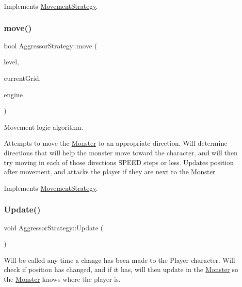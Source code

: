 Implements \hyperlink{class_movement_strategy}{Movement\+Strategy}.

\hypertarget{class_aggressor_strategy_aa6af9166835315b10af4ada4b614f954}{}\label{class_aggressor_strategy_aa6af9166835315b10af4ada4b614f954} 
\subsubsection{\texorpdfstring{move()}{move()}}
{\footnotesize\ttfamily bool Aggressor\+Strategy\+::move (\begin{DoxyParamCaption}\item[{\hyperlink{class_pre_built_level}{Pre\+Built\+Level} $\ast$}]{level,  }\item[{S\+D\+L\+\_\+\+Rect $\ast$}]{current\+Grid,  }\item[{\hyperlink{class_game_play_engine}{Game\+Play\+Engine} $\ast$}]{engine }\end{DoxyParamCaption})\hspace{0.3cm}{\ttfamily [virtual]}}

Movement logic algorithm. 

Attempts to move the \hyperlink{class_monster}{Monster} to an appropriate direction. Will determine directions that will help the monster move toward the character, and will then try moving in each of those directions S\+P\+E\+ED steps or less. Updates position after movement, and attacks the player if they are next to the \hyperlink{class_monster}{Monster} 

Implements \hyperlink{class_movement_strategy}{Movement\+Strategy}.

\hypertarget{class_aggressor_strategy_ad4ccf5fe66478c9066e84f0e302d08b1}{}\label{class_aggressor_strategy_ad4ccf5fe66478c9066e84f0e302d08b1} 
\subsubsection{\texorpdfstring{Update()}{Update()}}
{\footnotesize\ttfamily void Aggressor\+Strategy\+::\+Update (\begin{DoxyParamCaption}{ }\end{DoxyParamCaption})\hspace{0.3cm}{\ttfamily [virtual]}}

Will be called any time a change has been made to the Player character. Will check if position has changed, and if it has, will then update in the \hyperlink{class_monster}{Monster} so the \hyperlink{class_monster}{Monster} knows where the player is. 

